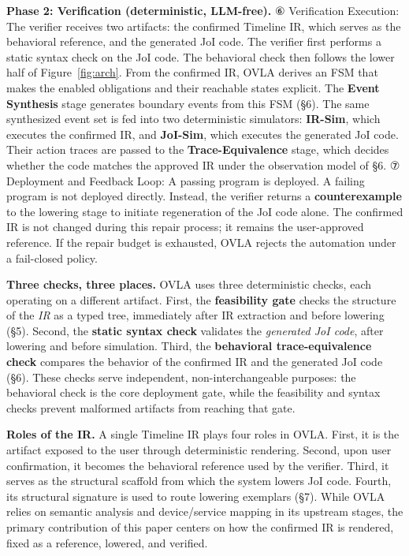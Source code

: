 \documentclass[sigconf,nonacm,anonymous,review]{acmart}
\begin{document}
\textbf{Phase 2: Verification (deterministic, LLM-free).} ⑥ Verification Execution: The verifier receives two artifacts: the confirmed Timeline IR, which serves as the behavioral reference, and the generated JoI code. %
The verifier first performs a static syntax check on the JoI code. The behavioral check then follows the lower half of Figure~\ref{fig:arch}. From the confirmed IR, OVLA derives an FSM that makes the enabled obligations and their reachable states explicit. The \textbf{Event Synthesis} stage generates boundary events from this FSM (\S6). The same synthesized event set is fed into two deterministic simulators: \textbf{IR-Sim}, which executes the confirmed IR, and \textbf{JoI-Sim}, which executes the generated JoI code. Their action traces are passed to the \textbf{Trace-Equivalence} stage, which decides whether the code matches the approved IR under the observation model of \S6. ⑦ Deployment and Feedback Loop: A passing program is deployed. A failing program is not deployed directly. Instead, the verifier returns a \textbf{counterexample} to the lowering stage to initiate regeneration of the JoI code alone.%
The confirmed IR is not changed during this repair process; it remains the user-approved reference. If the repair budget is exhausted, OVLA rejects the automation under a fail-closed policy.

\textbf{Three checks, three places.} OVLA uses three deterministic checks, each operating on a different artifact. First, the \textbf{feasibility gate} checks the structure of the \emph{IR} as a typed tree, immediately after IR extraction and before lowering (\S5). Second, the \textbf{static syntax check} validates the \emph{generated JoI code}, after lowering and before simulation. Third, the \textbf{behavioral trace-equivalence check} compares the behavior of the confirmed IR and the generated JoI code (\S6). These checks serve independent, non-interchangeable purposes: %
the behavioral check is the core deployment gate, while the feasibility and syntax checks prevent malformed artifacts from reaching that gate.

\textbf{Roles of the IR.} A single Timeline IR plays four roles in OVLA. First, it is the artifact exposed to the user through deterministic rendering. Second, upon user confirmation, it becomes the behavioral reference used by the verifier. Third, it serves as the structural scaffold from which the system lowers JoI code. Fourth, its structural signature is used to route lowering exemplars (\S7). While OVLA relies on semantic analysis and device/service mapping in its upstream stages, the primary contribution of this paper centers on how the confirmed IR is rendered, fixed as a reference, lowered, and verified.
\end{document}
